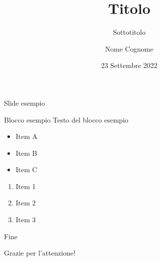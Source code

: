 \documentclass[8pt]{beamer}
\title{Titolo}
\subtitle{Sottotitolo}
\author{Nome Cognome}
\institute{Università di Pisa\\Dipartimento di Matematica}
\date{23 Settembre 2022}
\begin{document}
    \frame{\titlepage}
    
    \begin{frame}{Slide esempio}
        \begin{block}{Blocco esempio}
            Testo del blocco esempio
        \end{block}
        
        \begin{itemize}
            \item Item A
            \item Item B
            \item Item C
        \end{itemize}
        
        \begin{enumerate}
            \item Item 1
            \item Item 2
            \item Item 3
        \end{enumerate} 
    \end{frame}
    
    \begin{frame}{Fine}
        \begin{center}
			{
				\Huge
				Grazie per l'attenzione!
			}
        \end{center}
    \end{frame}
\end{document}
